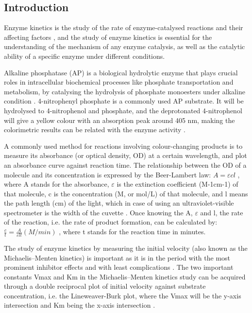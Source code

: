 \documentclass[a4paper,10pt]{article}
\begin{document}
\begin{multicols}{2}
\section{Introduction}


Enzyme kinetics is the study of the rate of enzyme-catalysed reactions and their affecting factors \cite{robinson2015enzymes}, and the study of enzyme kinetics is essential for the understanding of the mechanism of any enzyme catalysis, as well as the catalytic ability of a specific enzyme under different conditions.

Alkaline phosphatase (AP) is a biological hydrolytic enzyme that plays crucial roles in intracellular biochemical processes like phosphate transportation and metabolism, by catalysing the hydrolysis of phosphate monoesters under alkaline condition \cite{nguyen2017biochemical}\cite{gao2022extraction}\cite{lu2022fluorescent}. 4-nitrophenyl phosphate is a commonly used AP substrate. It will be hydrolysed to 4-nitrophenol and phosphate, and the deprotonated 4-nitrophenol will give a yellow colour with an absorption peak around 405 nm, making the colorimetric results can be related with the enzyme activity \cite{c2000demonstration}\cite{tang2019assays}.

A commonly used method for reactions involving colour-changing products is to measure its absorbance (or optical density, OD) at a certain wavelength, and plot an absorbance curve against reaction time. The relationship between the OD of a molecule and its concentration is expressed by the Beer-Lambert law: $ A=\varepsilon c l $ , where A stands for the absorbance, $\varepsilon$ is the extinction coefficient (M-1cm-1) of that molecule, c is the concentration (M, or mol/L) of that molecule, and l means the path length (cm) of the light, which in case of using an ultraviolet-visible spectrometer is the width of the cuvette \cite{punekar2018enzymes}. Once knowing the A, $\varepsilon$ and l, the rate of the reaction, i.e. the rate of product formation, can be calculated by: $\frac {c} {t} =\frac {A}{\varepsilon l t} (M/min) $ , where t stands for the reaction time in minutes.

The study of enzyme kinetics by measuring the initial velocity (also known as the Michaelis–Menten kinetics) is important as it is in the period with the most prominent inhibitor effects and with least complications \cite{lloyd2021steady}. The two important constants Vmax and Km in the Michaelis–Menten kinetics study can be acquired through a double reciprocal plot of initial velocity against substrate concentration, i.e. the Lineweaver-Burk plot, where the Vmax will be the y-axis intersection and Km being the x-axis intersection \cite{prinz2011enzyme}.


\end{multicols}
\end{document}
